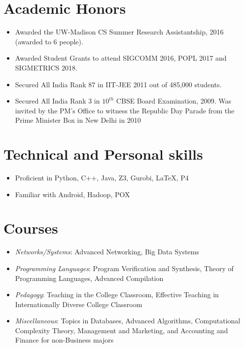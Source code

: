 \documentclass[11pt,a4paper,sans]{moderncv}        %
\begin{document}
\section{Academic  Honors}
\begin{itemize}
\item{Awarded the UW-Madison CS Summer Research Assistantship, 2016 (awarded to 6 people).}
\item{Awarded Student Grants to attend SIGCOMM 2016, POPL 2017 and SIGMETRICS 2018.}
\item{Secured All India Rank 87 in IIT-JEE 2011 out of 485,000 students.}
\item{Secured All India Rank 3 in $10^{th}$ CBSE Board Examination, 2009. Was invited by the PM's Office to witness the Republic Day Parade from the Prime Minister Box in New Delhi in 2010}
\end{itemize}

\section{Technical and Personal skills}
\begin{itemize}
\item Proficient in Python, C++, Java, Z3, Gurobi, \LaTeX, P4
\item Familiar with Android, Hadoop, POX
\end{itemize}

\section{Courses}
\begin{itemize}
	\item \emph{Networks/Systems}: Advanced Networking, Big Data Systems
	\item \emph{Programming Languages}: Program Verification and Synthesis,
	Theory of Programming Languages, Advanced Compilation
	\item \emph{Pedagogy}: Teaching in the College Classroom, Effective
	Teaching in Internationally Diverse College Classroom 
	\item \emph{Miscellaneous}: Topics in Databases, Advanced Algorithms,
	Computational Complexity Theory, Management and Marketing, and Accounting and Finance
	for non-Business majors
\end{itemize}
\end{document}
